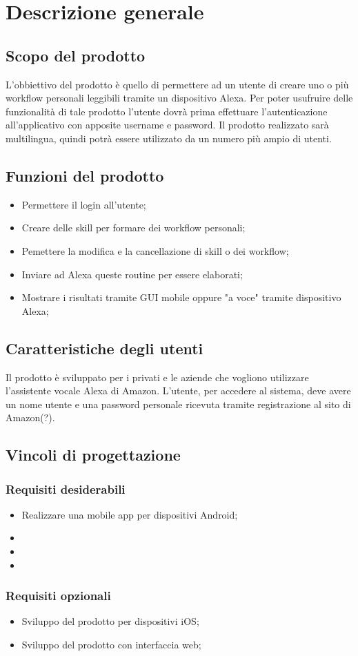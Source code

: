 \chapter{Descrizione generale}

\section{Scopo del prodotto}
L'obbiettivo del prodotto è quello di permettere ad un utente di creare uno o più workflow personali leggibili tramite un dispositivo Alexa.
Per poter usufruire delle funzionalità di tale prodotto l'utente dovrà prima effettuare l'autenticazione all'applicativo con apposite username e password.
Il prodotto realizzato sarà multilingua, quindi potrà essere utilizzato da un numero più ampio di utenti.


\section{Funzioni del prodotto}
\begin{itemize}
	\item Permettere il login all'utente;
	\item Creare delle skill per formare dei workflow personali;
	\item Pemettere la modifica e la cancellazione di skill o dei workflow;
	\item Inviare ad Alexa queste routine per essere elaborati;
	\item Mostrare i risultati tramite GUI mobile oppure "a voce" tramite dispositivo Alexa;
\end{itemize}

\section{Caratteristiche degli utenti}
Il prodotto è sviluppato per i privati e le aziende che vogliono utilizzare l'assistente vocale Alexa di Amazon.
L'utente, per accedere al sistema, deve avere un nome utente e una password personale ricevuta tramite registrazione al sito di Amazon(?).

\section{Vincoli di progettazione}
\subsection{Requisiti desiderabili}
\begin{itemize}
	\item Realizzare una mobile app per dispositivi Android;
	\item
	\item
	\item
\end{itemize}
\subsection{Requisiti opzionali}
\begin{itemize}
	\item Sviluppo del prodotto per dispositivi iOS;
	\item Sviluppo del prodotto con interfaccia web;
\end{itemize}